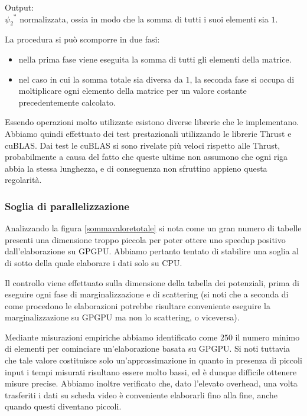 \documentclass[a4paper]{article}   %
\begin{document}
Output:\\
${\psi_2}^{*}$ normalizzata, ossia in modo che la somma di tutti i suoi elementi sia $1$.

La procedura si può scomporre in due fasi:
\begin{itemize}
\item nella prima fase viene eseguita la somma di tutti gli elementi della matrice.
\item nel caso in cui la somma totale sia diversa da $1$, la seconda fase si occupa di moltiplicare ogni elemento della matrice per un valore costante precedentemente calcolato.
\end{itemize}
Essendo operazioni molto utilizzate esistono diverse librerie che le implementano. Abbiamo quindi effettuato dei test prestazionali utilizzando le librerie Thrust e cuBLAS.
Dai test le cuBLAS si sono rivelate più veloci rispetto alle Thrust, probabilmente a causa del fatto che queste ultime non assumono che ogni riga abbia la stessa lunghezza, e di conseguenza non sfruttino appieno questa regolarità.

\subsubsection{Soglia di parallelizzazione}
Analizzando la figura \ref{sommavaloretotale} si nota come un gran numero di tabelle presenti una dimensione troppo piccola per poter ottere uno speedup positivo dall'elaborazione su GPGPU.
Abbiamo pertanto tentato di stabilire una soglia al di sotto della quale elaborare i dati solo su CPU. 

Il controllo viene effettuato sulla dimensione della tabella dei potenziali, prima di eseguire ogni fase di marginalizzazione e di scattering (si noti che a seconda di come procedono le elaborazioni potrebbe risultare conveniente eseguire la marginalizzazione su GPGPU ma non lo scattering, o viceversa).

Mediante misurazioni empiriche abbiamo identificato come $250$ il numero minimo di elementi per cominciare un'elaborazione basata su GPGPU.
Si noti tuttavia che tale valore costituisce solo un'approssimazione in quanto in presenza di piccoli input i tempi misurati risultano essere molto bassi, ed è dunque difficile ottenere misure precise.
Abbiamo inoltre verificato che, dato l’elevato overhead, una volta trasferiti i dati su scheda video è conveniente elaborarli fino alla fine, anche quando questi diventano piccoli.
\end{document}
